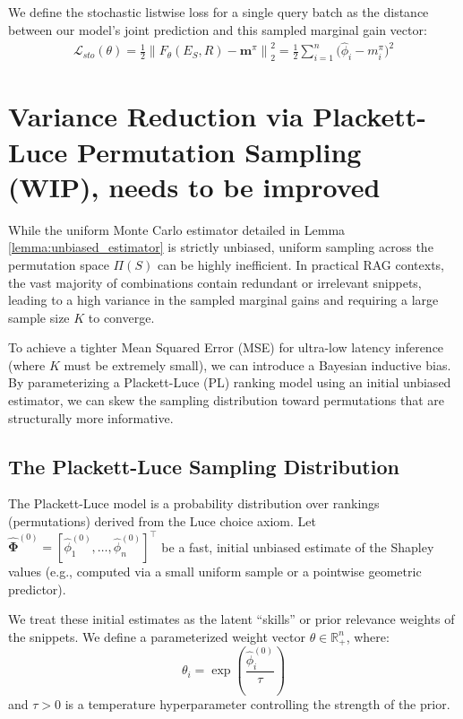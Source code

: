 \documentclass{article}
\begin{document}
We define the stochastic listwise loss for a single query batch as the distance between our model's joint prediction and this sampled marginal gain vector:
\begin{align} \label{eq:listwise_loss}
\mathcal{L}_{sto}(\theta) = \frac{1}{2} \left\| F_\theta(E_S, R) - \mathbf{m}^\pi \right\|_2^2 = \frac{1}{2} \sum_{i=1}^n \Big( \hat{\phi}_i - m_i^\pi \Big)^2
\end{align}



\section{Variance Reduction via Plackett-Luce Permutation Sampling (WIP), needs to be improved}

While the uniform Monte Carlo estimator detailed in Lemma \ref{lemma:unbiased_estimator} is strictly unbiased, uniform sampling across the permutation space $\Pi(S)$ can be highly inefficient. In practical RAG contexts, the vast majority of combinations contain redundant or irrelevant snippets, leading to a high variance in the sampled marginal gains and requiring a large sample size $K$ to converge. 

To achieve a tighter Mean Squared Error (MSE) for ultra-low latency inference (where $K$ must be extremely small), we can introduce a Bayesian inductive bias. By parameterizing a Plackett-Luce (PL) ranking model using an initial unbiased estimator, we can skew the sampling distribution toward permutations that are structurally more informative.

\subsection{The Plackett-Luce Sampling Distribution}

The Plackett-Luce model is a probability distribution over rankings (permutations) derived from the Luce choice axiom. Let $\hat{\mathbf{\Phi}}^{(0)} = [\hat{\phi}_1^{(0)}, \dots, \hat{\phi}_n^{(0)}]^\top$ be a fast, initial unbiased estimate of the Shapley values (e.g., computed via a small uniform sample or a pointwise geometric predictor). 

We treat these initial estimates as the latent ``skills'' or prior relevance weights of the snippets. We define a parameterized weight vector $\theta \in \mathbb{R}^n_{+}$, where:
$$ \theta_i = \exp\left( \frac{\hat{\phi}_i^{(0)}}{\tau} \right) $$
and $\tau > 0$ is a temperature hyperparameter controlling the strength of the prior.
\end{document}
